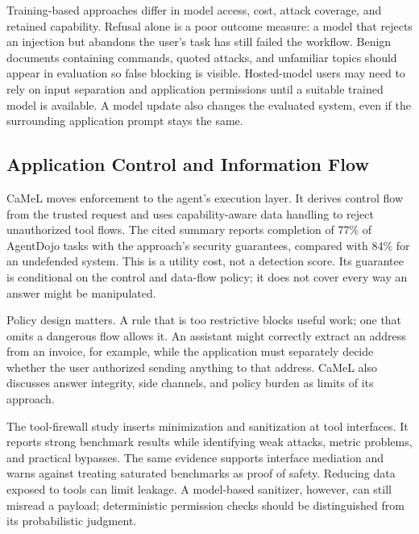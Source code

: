 \documentclass[conference]{IEEEtran}
\begin{document}
Training-based approaches differ in model access, cost, attack coverage, and retained capability. Refusal alone is a poor outcome measure: a model that rejects an injection but abandons the user's task has still failed the workflow. Benign documents containing commands, quoted attacks, and unfamiliar topics should appear in evaluation so false blocking is visible. Hosted-model users may need to rely on input separation and application permissions until a suitable trained model is available. A model update also changes the evaluated system, even if the surrounding application prompt stays the same.

\subsection{Application Control and Information Flow}
CaMeL \cite{debenedetti2025camel} moves enforcement to the agent's execution layer. It derives control flow from the trusted request and uses capability-aware data handling to reject unauthorized tool flows. The cited summary reports completion of 77\% of AgentDojo tasks with the approach's security guarantees, compared with 84\% for an undefended system. This is a utility cost, not a detection score. Its guarantee is conditional on the control and data-flow policy; it does not cover every way an answer might be manipulated.

Policy design matters. A rule that is too restrictive blocks useful work; one that omits a dangerous flow allows it. An assistant might correctly extract an address from an invoice, for example, while the application must separately decide whether the user authorized sending anything to that address. CaMeL also discusses answer integrity, side channels, and policy burden as limits of its approach.

The tool-firewall study \cite{bhagwatkar2025firewalls} inserts minimization and sanitization at tool interfaces. It reports strong benchmark results while identifying weak attacks, metric problems, and practical bypasses. The same evidence supports interface mediation and warns against treating saturated benchmarks as proof of safety. Reducing data exposed to tools can limit leakage. A model-based sanitizer, however, can still misread a payload; deterministic permission checks should be distinguished from its probabilistic judgment.
\end{document}
